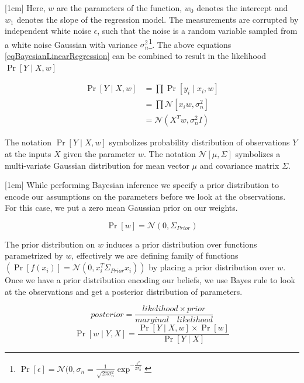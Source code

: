 [1cm]
Here, \(w\) are the parameters of the function, \(w_{0}\) denotes the intercept and \(w_{1}\) denotes the slope of the regression model. The measurements are corrupted by independent white noise \(\epsilon\), such that the noise is a random variable sampled from a white noise Gaussian with variance \(\sigma_{n}^{2}\)\footnote{\(\Pr[\epsilon] = \mathcal{N}(0, \sigma_{n} = \frac{1}{\sqrt{2\pi\sigma_{n}^{2}}}\exp^{-\frac{\epsilon^{2}}{2\sigma_{n}^{2}}}
\)}. The above equations \ref{eqBayesianLinearRegression} can be combined to result in the likelihood \(\Pr[Y\mid X, w]\)

\begin{equation}\label{eqBayesianLikelihood}
\begin{aligned}
\Pr[Y \mid X, w]  & = \prod \Pr[y_{i}\mid x_{i}, w]\\
                & = \prod \mathcal{N}[x_{i}w , \sigma_{n}^{2}]\\
                & = \mathcal{N}(X^{T} w, \sigma_{n}^{2}I)    
\end{aligned}
\end{equation}

The notation \(\Pr[Y \mid X, w]\) symbolizes probability distribution of observations \(Y\) at the inputs \(X\) given the parameter \(w\). The notation \(\mathcal{N}[\mu , \Sigma]\) symbolizes a multi-variate Gaussian distribution for mean vector \(\mu\) and covariance matrix \(\Sigma\). 

[1cm]
While performing Bayesian inference we specify a prior distribution to encode our assumptions on the parameters before we look at the observations. For this case, we put a zero mean Gaussian prior on our weights.

\begin{equation}\label{eqBayesianPrior}
\Pr[w] = \mathcal{N}(0, \Sigma_{Prior})
\end{equation}

The prior distribution on \(w\) induces a prior distribution over functions parametrized by \(w\), effectively we are defining family of functions \((\Pr[f(x_{i})] = \mathcal{N}(0, x_{i}^{T}\Sigma_{Prior}x_{i}))\) by placing a prior distribution over \(w\). Once we have a prior distribution encoding our beliefs, we use Bayes rule to look at the observations and get a posterior distribution of parameters.

\begin{equation*}
posterior = \frac{likelihood \times prior}{marginal \quad likelihood}
\end{equation*}
\begin{equation}\label{eqBayesRule}
\Pr[w \mid Y, X] = \frac{\Pr[Y \mid X, w] \times \Pr[w]}{\Pr[Y \mid X]}
\end{equation}

